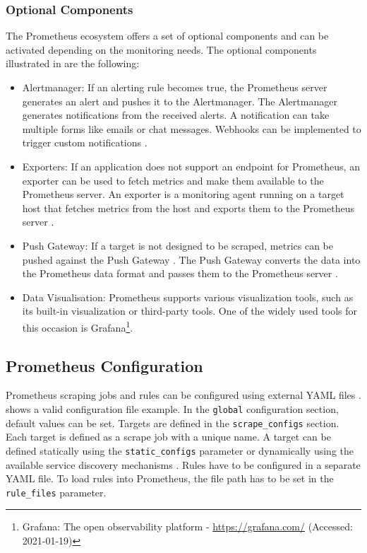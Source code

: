 \subsubsection{Optional Components}
The Prometheus ecosystem offers a set of optional components and can be activated depending on the monitoring needs.
The optional components illustrated in  are the following:

\begin{itemize}
\item Alertmanager:
If an alerting rule becomes true, the Prometheus server generates an alert and pushes it to the Alertmanager. The Alertmanager generates notifications from the received alerts. A notification can take multiple forms like emails or chat messages. Webhooks can be implemented to trigger custom notifications \cite{Bastos2019Prom}.

\item Exporters:
If an application does not support an endpoint for Prometheus, an exporter can be used to fetch metrics and make them available to the Prometheus server. An exporter is a monitoring agent running on a target host that fetches metrics from the host and exports them to the Prometheus server \cite{Pandey2020Monitoring}.

\item Push Gateway:
If a target is not designed to be scraped, metrics can be pushed against the Push Gateway \cite{Prom2020Docs}. The Push Gateway converts the data into the Prometheus data format and passes them to the Prometheus server \cite{Pandey2020Monitoring}.

\item Data Visualisation:
Prometheus supports various visualization tools, such as its built-in visualization or third-party tools. One of the widely used tools for this occasion is Grafana\footnote{Grafana: The open observability platform - \url{https://grafana.com/} (Accessed: 2021-01-19)}.
\end{itemize}


\subsection{Prometheus Configuration}
\label{sec:04_prom_config}
Prometheus scraping jobs and rules can be configured using external YAML files \cite{Prom2020Docs}.
 shows a valid configuration file example.
In the \texttt{global} configuration section, default values can be set.
Targets are defined in the \texttt{scrape\_configs} section. Each target is defined as a scrape job with a unique name.  A target can be defined statically using the \texttt{static\_configs} parameter or dynamically using the available service discovery mechanisms \cite{Prom2020Docs}.
Rules have to be configured in a separate YAML file. To load rules into Prometheus, the file path has to be set in the \texttt{rule\_files} parameter.

